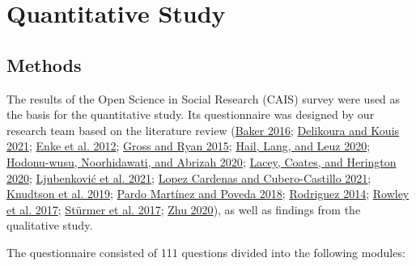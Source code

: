 \documentclass[
  letterpaper,
  DIV=11,
  numbers=noendperiod]{scrartcl}
\begin{document}
\hypertarget{quantitative-study}{%
\section{Quantitative Study}\label{quantitative-study}}

\hypertarget{methods-1}{%
\subsection{Methods}\label{methods-1}}

The results of the Open Science in Social Research (CAIS) survey were
used as the basis for the quantitative study. Its questionnaire was
designed by our research team based on the literature review
(\protect\hyperlink{ref-baker_1500_2016}{Baker 2016};
\protect\hyperlink{ref-delikoura_open_2021}{Delikoura and Kouis 2021};
\protect\hyperlink{ref-enke_user_2012}{Enke et al. 2012};
\protect\hyperlink{ref-gross_landscapes_2015}{Gross and Ryan 2015};
\protect\hyperlink{ref-hail_reproducibility_2020}{Hail, Lang, and Leuz
2020}; \protect\hyperlink{ref-hodonu-wusu_malasyan_2020}{Hodonu-wusu,
Noorhidawati, and Abrizah 2020};
\protect\hyperlink{ref-lacey_open_2020}{Lacey, Coates, and Herington
2020}; \protect\hyperlink{ref-ljubenkovic_survey_2021}{Ljubenković et
al. 2021}; \protect\hyperlink{ref-lopezcardenas_percepciones_2021}{Lopez
Cardenas and Cubero-Castillo 2021};
\protect\hyperlink{ref-knudtson_survey_2019}{Knudtson et al. 2019};
\protect\hyperlink{ref-pardomartinez_knowledge_2018}{Pardo Martínez and
Poveda 2018}; \protect\hyperlink{ref-rodriguez_awareness_2014}{Rodriguez
2014}; \protect\hyperlink{ref-rowley_academics_2017}{Rowley et al.
2017}; \protect\hyperlink{ref-sturmer_earlycareer_2017}{Stürmer et al.
2017}; \protect\hyperlink{ref-zhu_openaccess_2020}{Zhu 2020}), as well
as findings from the qualitative study.

The questionnaire consisted of 111 questions divided into the following
modules:
\end{document}
